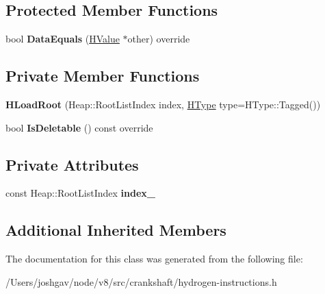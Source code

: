 \subsection*{Protected Member Functions}
\begin{DoxyCompactItemize}
\item 
bool {\bfseries Data\+Equals} (\hyperlink{classv8_1_1internal_1_1_h_value}{H\+Value} $\ast$other) override\hypertarget{classv8_1_1internal_1_1_h_load_root_a150420cac07aef9cd1e5b3e2113695bc}{}\label{classv8_1_1internal_1_1_h_load_root_a150420cac07aef9cd1e5b3e2113695bc}

\end{DoxyCompactItemize}
\subsection*{Private Member Functions}
\begin{DoxyCompactItemize}
\item 
{\bfseries H\+Load\+Root} (Heap\+::\+Root\+List\+Index index, \hyperlink{classv8_1_1internal_1_1_h_type}{H\+Type} type=H\+Type\+::\+Tagged())\hypertarget{classv8_1_1internal_1_1_h_load_root_a7251398a81e83196e0d3e07ca0ddaaf7}{}\label{classv8_1_1internal_1_1_h_load_root_a7251398a81e83196e0d3e07ca0ddaaf7}

\item 
bool {\bfseries Is\+Deletable} () const  override\hypertarget{classv8_1_1internal_1_1_h_load_root_a82a91f5a3c3dae1c0688e744fba96ed4}{}\label{classv8_1_1internal_1_1_h_load_root_a82a91f5a3c3dae1c0688e744fba96ed4}

\end{DoxyCompactItemize}
\subsection*{Private Attributes}
\begin{DoxyCompactItemize}
\item 
const Heap\+::\+Root\+List\+Index {\bfseries index\+\_\+}\hypertarget{classv8_1_1internal_1_1_h_load_root_ac4d3d6cda0f4b1dd65683da1de34562b}{}\label{classv8_1_1internal_1_1_h_load_root_ac4d3d6cda0f4b1dd65683da1de34562b}

\end{DoxyCompactItemize}
\subsection*{Additional Inherited Members}


The documentation for this class was generated from the following file\+:\begin{DoxyCompactItemize}
\item 
/\+Users/joshgav/node/v8/src/crankshaft/hydrogen-\/instructions.\+h\end{DoxyCompactItemize}
